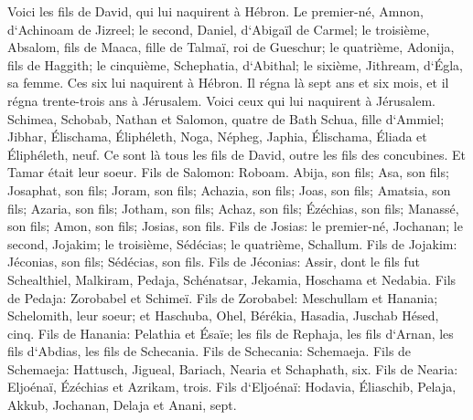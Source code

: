 \verse Voici les fils de David, qui lui naquirent à Hébron. Le premier-né, Amnon, d`Achinoam de Jizreel; le second, Daniel, d`Abigaïl de Carmel; 
\verse le troisième, Absalom, fils de Maaca, fille de Talmaï, roi de Gueschur; le quatrième, Adonija, fils de Haggith; 
\verse le cinquième, Schephatia, d`Abithal; le sixième, Jithream, d`Égla, sa femme. 
\verse Ces six lui naquirent à Hébron. Il régna là sept ans et six mois, et il régna trente-trois ans à Jérusalem. 
\verse Voici ceux qui lui naquirent à Jérusalem. Schimea, Schobab, Nathan et Salomon, quatre de Bath Schua, fille d`Ammiel; 
\verse Jibhar, Élischama, Éliphéleth, 
\verse Noga, Népheg, Japhia, Élischama, 
\verse Éliada et Éliphéleth, neuf. 
\verse Ce sont là tous les fils de David, outre les fils des concubines. Et Tamar était leur soeur. 
\verse Fils de Salomon: Roboam. Abija, son fils; Asa, son fils; Josaphat, son fils; 
\verse Joram, son fils; Achazia, son fils; Joas, son fils; 
\verse Amatsia, son fils; Azaria, son fils; Jotham, son fils; 
\verse Achaz, son fils; Ézéchias, son fils; Manassé, son fils; 
\verse Amon, son fils; Josias, son fils. 
\verse Fils de Josias: le premier-né, Jochanan; le second, Jojakim; le troisième, Sédécias; le quatrième, Schallum. 
\verse Fils de Jojakim: Jéconias, son fils; Sédécias, son fils. 
\verse Fils de Jéconias: Assir, dont le fils fut Schealthiel, 
\verse Malkiram, Pedaja, Schénatsar, Jekamia, Hoschama et Nedabia. 
\verse Fils de Pedaja: Zorobabel et Schimeï. Fils de Zorobabel: Meschullam et Hanania; Schelomith, leur soeur; 
\verse et Haschuba, Ohel, Bérékia, Hasadia, Juschab Hésed, cinq. 
\verse Fils de Hanania: Pelathia et Ésaïe; les fils de Rephaja, les fils d`Arnan, les fils d`Abdias, les fils de Schecania. 
\verse Fils de Schecania: Schemaeja. Fils de Schemaeja: Hattusch, Jigueal, Bariach, Nearia et Schaphath, six. 
\verse Fils de Nearia: Eljoénaï, Ézéchias et Azrikam, trois. 
\verse Fils d`Eljoénaï: Hodavia, Éliaschib, Pelaja, Akkub, Jochanan, Delaja et Anani, sept. 

\chapter{}


